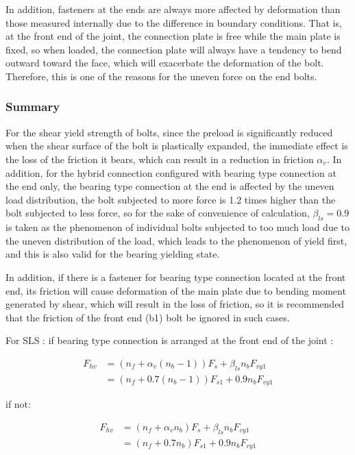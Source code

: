 In addition, fasteners at the ends are always more affected by deformation than those measured internally due to the difference in boundary conditions. That is, at the front end of the joint, the connection plate is free while the main plate is fixed, so when loaded, the connection plate will always have a tendency to bend outward toward the face, which will exacerbate the deformation of the bolt. Therefore, this is one of the reasons for the uneven force on the end bolts.


\subsubsection{Summary}

For the shear yield strength of bolts, since the preload is significantly reduced when the shear surface of the bolt is plastically expanded, the immediate effect is the loss of the friction it bears, which can result in a reduction in friction $\alpha_{v}$. In addition, for the hybrid connection configured with bearing type connection at the end only, the bearing type connection at the end is affected by the uneven load distribution, the bolt subjected to more force is 1.2 times higher than the bolt subjected to less force, so for the sake of convenience of calculation, $\beta_{ls} = 0.9 $ is taken as the phenomenon of individual bolts subjected to too much load due to the uneven distribution of the load, which leads to the phenomenon of yield first, and this is also valid for the bearing yielding state.

In addition, if there is a fastener for bearing type connection located at the front end, its friction will cause deformation of the main plate due to bending moment generated by shear, which will result in the loss of friction, so it is recommended that the friction of the front end (b1) bolt be ignored in such cases.

For SLS :
if bearing type connection is arranged at the front end of the joint :

\begin{equation}
\begin{aligned}
    F_{hv} &= (n_f+ \alpha_v(n_b-1)) F_s + \beta_{ls} n_b F_{vy1} \\
           &= (n_f + 0.7(n_b-1)) F_{s1} + 0.9 n_b F_{vy1}
\end{aligned}
\end{equation}

if not:

\begin{equation}
\begin{aligned}
    F_{hv} &= (n_f+ \alpha_v n_b) F_s + \beta_{ls} n_b F_{vy1} \\
           &= (n_f + 0.7 n_b) F_{s1} + 0.9 n_b F_{vy1}
\end{aligned}
\end{equation}

